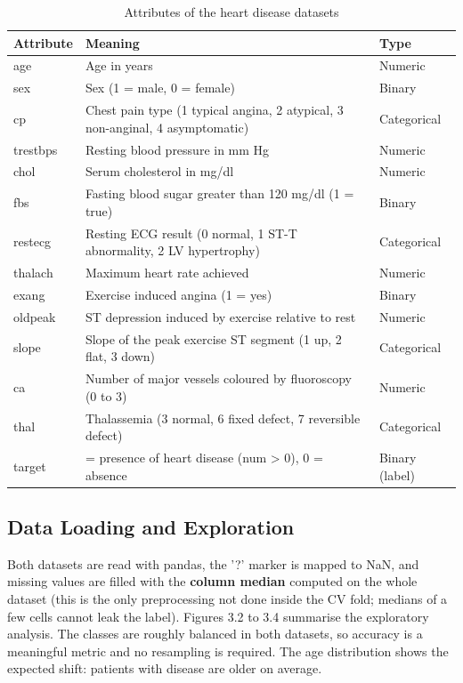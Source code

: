 \documentclass[12pt,a4paper,oneside]{report}
\begin{document}
\begin{table}[htbp]
\centering
\caption{Attributes of the heart disease datasets}
\footnotesize
\begin{tabular}{>{\raggedright\arraybackslash}p{}>{\raggedright\arraybackslash}p{}>{\raggedright\arraybackslash}p{}}
\hline
\textbf{Attribute} & \textbf{Meaning} & \textbf{Type} \\
\hline
age & Age in years & Numeric \\
sex & Sex (1 = male, 0 = female) & Binary \\
cp & Chest pain type (1 typical angina, 2 atypical, 3 non-anginal, 4 asymptomatic) & Categorical \\
trestbps & Resting blood pressure in mm Hg & Numeric \\
chol & Serum cholesterol in mg/dl & Numeric \\
fbs & Fasting blood sugar greater than 120 mg/dl (1 = true) & Binary \\
restecg & Resting ECG result (0 normal, 1 ST-T abnormality, 2 LV hypertrophy) & Categorical \\
thalach & Maximum heart rate achieved & Numeric \\
exang & Exercise induced angina (1 = yes) & Binary \\
oldpeak & ST depression induced by exercise relative to rest & Numeric \\
slope & Slope of the peak exercise ST segment (1 up, 2 flat, 3 down) & Categorical \\
ca & Number of major vessels coloured by fluoroscopy (0 to 3) & Numeric \\
thal & Thalassemia (3 normal, 6 fixed defect, 7 reversible defect) & Categorical \\
target & 1 = presence of heart disease (num \textgreater{} 0), 0 = absence & Binary (label) \\
\hline
\end{tabular}
\end{table}

\subsection{Data Loading and Exploration}
Both datasets are read with pandas, the '?' marker is mapped to NaN, and missing values are filled with the \textbf{column median} computed on the whole dataset (this is the only preprocessing not done inside the CV fold; medians of a few cells cannot leak the label). Figures 3.2 to 3.4 summarise the exploratory analysis. The classes are roughly balanced in both datasets, so accuracy is a meaningful metric and no resampling is required. The age distribution shows the expected shift: patients with disease are older on average.
\end{document}
